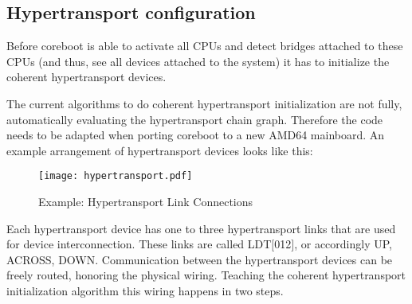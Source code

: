 \documentclass[titlepage,12pt]{article}
\begin{document}
\subsection{Hypertransport configuration}
Before coreboot is able to activate all CPUs and detect bridges
attached to these CPUs (and thus, see all devices attached to the
system) it has to initialize the coherent hypertransport devices.

The current algorithms to do coherent hypertransport initialization are
not fully, automatically evaluating the hypertransport chain graph.
Therefore the code needs to be adapted when porting coreboot to a new
AMD64 mainboard. An example arrangement of hypertransport devices
looks like this:

\begin{figure}[htb]
\centering
\texttt{[image: hypertransport.pdf]}
\caption{Example: Hypertransport Link Connections}
\label{fix:hypertransport}
\end{figure}

Each hypertransport device has one to three hypertransport links that
are used for device interconnection. These links are called LDT$[$012$]$, or
accordingly UP, ACROSS, DOWN.  Communication between the hypertransport
devices can be freely routed, honoring the physical wiring. Teaching the
coherent hypertransport initialization algorithm this wiring happens in
two steps.

\newpage
\end{document}

